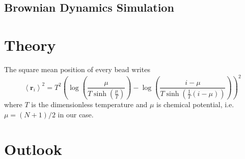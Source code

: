 \documentclass[12pt,a4paper]{article}
\begin{document}
\subsection{Brownian Dynamics Simulation}
\label{sub:brownian_dynamics_simulation}

\section{Theory}
\label{sec:theory}

The square mean position of every bead writes
\begin{equation}
	\left<\mathbf{r}_i\right>^2  = 
T^{2} \left(\log{\left (\frac{\mu}{T \sinh{\left (\frac{\mu}{T} \right )}} \right )} - \log{\left (\frac{i - \mu}{T \sinh{\left (\frac{1}{T} \left(i - \mu\right) \right )}} \right )}\right)^{2}
\end{equation}
where $T$ is the dimensionless temperature and $\mu$ is chemical potential, i.e.
$\mu = (N+1)/2$ in our case.

\section{Outlook}
\label{sec:outlook}




\end{document}
